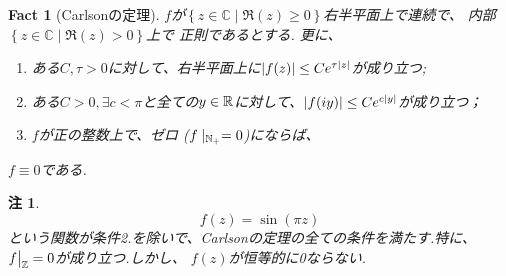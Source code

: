 \documentclass[12pt]{article} %
\newtheorem*{fact*}{Fact}
\newtheorem*{remark*}{\textbf{注}}
\theoremstyle{remark}
\begin{document}
{\begin{fact*}[Carlsonの定理]
	$f$が$\left\{ z\in\mathbb{C}\mid \Re(z)\ge0 \right\}$右半平面上で連続で、
	内部$\left\{ z\in\mathbb{C}\mid\Re(z)>0 \right\}$上で
	正則であるとする.
	更に、
	\begin{enumerate}
		\item ある$C,\tau>0$に対して、右半平面上に$\left|f(z)\right|\le C e^{\tau\left|z\right|}$が成り立つ;
		\item ある$ C>0,\exists c<\pi$と全ての$y\in\mathbb{R}$に対して、$\left|f(iy)\right|\le Ce^{c\left|y\right|}$が成り立つ；
		\item $f$が正の整数上で、ゼロ ($f\mid_{\mathbb{N}_+}=0$)にならば、
	\end{enumerate}
	$f\equiv0$である.
\end{fact*}
		
\begin{remark*}
	\begin{equation*}
		f(z)=\sin(\pi z)
	\end{equation*}
	という関数が条件2.を除いで、Carlsonの定理の全ての条件を満たす.特に、
	$f\big|_{\mathbb{Z}}=0$が成り立つ.しかし、 $f(z)$が恒等的に0ならない.


\end{remark*}}
\end{document}
